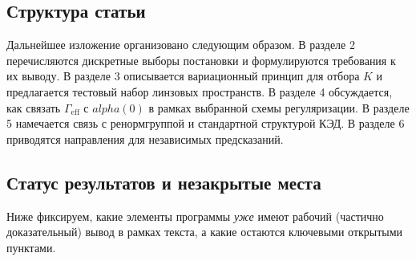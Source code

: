 \documentclass[12pt]{article}
\def\alpha{alpha}%
\begin{document}
\subsection{Структура статьи}
Дальнейшее изложение организовано следующим образом.
В разделе 2 перечисляются дискретные выборы постановки и формулируются требования к их выводу.
В разделе 3 описывается вариационный принцип для отбора $K$ и предлагается тестовый набор линзовых пространств.
В разделе 4 обсуждается, как связать $\Gamma_{\mathrm{eff}}$ с $\alpha(0)$ в рамках выбранной схемы регуляризации.
В разделе 5 намечается связь с ренормгруппой и стандартной структурой КЭД.
В разделе 6 приводятся направления для независимых предсказаний.

\subsection{Статус результатов и незакрытые места}
Ниже фиксируем, какие элементы программы \emph{уже} имеют рабочий (частично доказательный) вывод в рамках текста, а какие остаются ключевыми открытыми пунктами.
\end{document}
